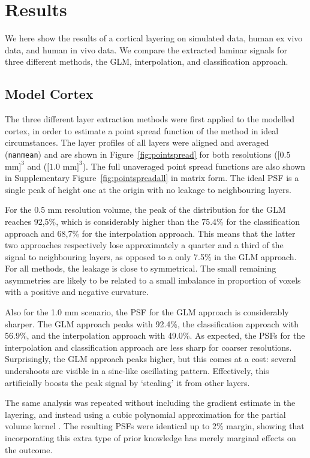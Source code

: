 \section{Results}
We here show the results of a cortical layering on simulated data, human ex vivo data, and human in vivo data. We compare the extracted laminar signals for three different methods, the GLM, interpolation, and classification approach.

\subsection{Model Cortex}
The three different layer extraction methods were first applied to the modelled cortex, in order to estimate a point spread function of the method in ideal circumstances. The layer profiles of all layers were aligned and averaged (\texttt{nanmean}) and are shown in Figure~\ref{fig:pointspread} for both resolutions ($[0.5 $ mm$]^3$ and ($[1.0 $ mm$]^3$). The full unaveraged point spread functions are also shown in Supplementary Figure~\ref{fig:pointspreadall} in matrix form. The ideal PSF is a single peak of height one at the origin with no leakage to neighbouring layers.


For the 0.5 mm resolution volume, the peak of the distribution for the GLM reaches 92,5\%, which is considerably higher than the 75.4\% for the classification approach and 68,7\% for the interpolation approach. This means that the latter two approaches respectively lose approximately a quarter and a third of the signal to neighbouring layers, as opposed to a only 7.5\% in the GLM approach. For all methods, the leakage is close to symmetrical. The small remaining asymmetries are likely to be related to a small imbalance in proportion of voxels with a positive and negative curvature.

Also for the 1.0 mm scenario, the PSF for the GLM approach is considerably sharper. The GLM approach peaks with 92.4\%, the classification approach with 56.9\%, and the interpolation approach with 49.0\%. As expected, the PSFs for the interpolation and classification approach are less sharp for coarser resolutions. Surprisingly, the GLM approach peaks higher, but this comes at a cost: several undershoots are visible in a sinc-like oscillating pattern. Effectively, this artificially boosts the peak signal by `stealing' it from other layers.

The same analysis was repeated without including the gradient estimate in the layering, and instead using a cubic polynomial approximation for the partial volume kernel \cite{Koopmans2011}. The resulting PSFs were identical up to 2\% margin, showing that incorporating this extra type of prior knowledge has merely marginal effects on the outcome.

